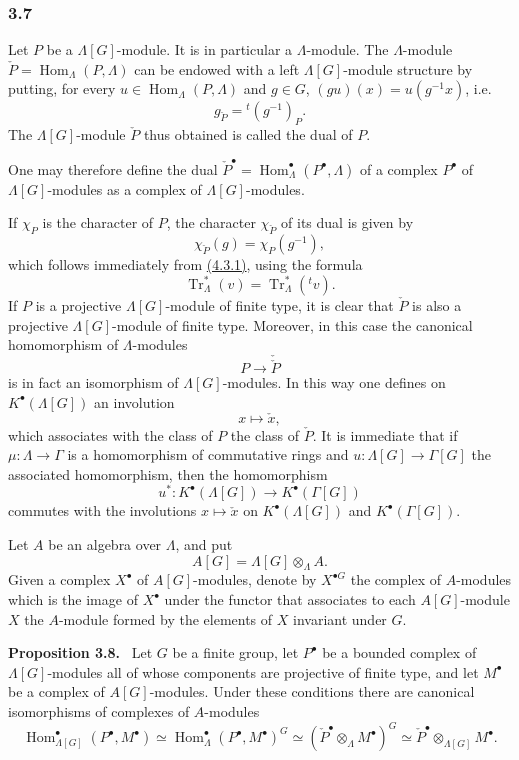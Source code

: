\documentclass[11pt]{article}
\newenvironment{statement}[1]{\par\medskip\noindent\textbf{#1.}\ }{\par\medskip}
\DeclareMathOperator{\Hom}{Hom}
\providecommand{\Tr}{\operatorname{Tr}}
\providecommand{\Tr}{\operatorname{Tr}}
\providecommand{\Tr}{\operatorname{Tr}}
\providecommand{\Hom}{\operatorname{Hom}}
\providecommand{\Tr}{\operatorname{Tr}}
\providecommand{\Hom}{\operatorname{Hom}}
\providecommand{\Tr}{\operatorname{Tr}}
\begin{document}
\subsubsection*{3.7}\label{sga5:X:subsubsection:3.7}

Let $P$ be a $\Lambda[G]$-module. It is in particular a $\Lambda$-module. The $\Lambda$-module $\check P=\Hom_\Lambda(P,\Lambda)$ can be endowed with a left $\Lambda[G]$-module structure by putting, for every $u\in\Hom_\Lambda(P,\Lambda)$ and $g\in G$, $(gu)(x)=u(g^{-1}x)$, i.e.
\[
g_{\check P}={}^{t}(g^{-1})_P.
\tag{3.7.1}\label{sga5:X:equation:3.7.1}
\]
The $\Lambda[G]$-module $\check P$ thus obtained is called the dual of $P$.

One may therefore define the dual $\check P^\bullet=\Hom_\Lambda^\bullet(P^\bullet,\Lambda)$ of a complex $P^\bullet$ of $\Lambda[G]$-modules as a complex of $\Lambda[G]$-modules.

If $\chi_P$ is the character of $P$, the character $\chi_{\check P}$ of its dual is given by
\[
\chi_{\check P}(g)=\chi_P(g^{-1}),
\tag{3.7.2}\label{sga5:X:equation:3.7.2}
\]
which follows immediately from \hyperref[sga5:X:equation:3.7.1]{(4.3.1)}, using the formula
\[
\Tr_\Lambda^*(v)=\Tr_\Lambda^*({}^{t}v).
\]
If $P$ is a projective $\Lambda[G]$-module of finite type, it is clear that $\check P$ is also a projective $\Lambda[G]$-module of finite type. Moreover, in this case the canonical homomorphism of $\Lambda$-modules
\[
P\longrightarrow\check{\check P}
\]
is in fact an isomorphism of $\Lambda[G]$-modules. In this way one defines on $K^{\bullet}(\Lambda[G])$ an involution
\[
x\longmapsto \check x,
\]
which associates with the class of $P$ the class of $\check P$. It is immediate that if $\mu:\Lambda\to\Gamma$ is a homomorphism of commutative rings and $u:\Lambda[G]\to\Gamma[G]$ the associated homomorphism, then the homomorphism
\[
u^*:K^{\bullet}(\Lambda[G])\longrightarrow K^{\bullet}(\Gamma[G])
\]
commutes with the involutions $x\longmapsto\check x$ on $K^{\bullet}(\Lambda[G])$ and $K^{\bullet}(\Gamma[G])$.

Let $A$ be an algebra over $\Lambda$, and put
\[
A[G]=\Lambda[G]\otimes_\Lambda A.
\]
Given a complex $X^\bullet$ of $A[G]$-modules, denote by $X^{\bullet G}$ the complex of $A$-modules which is the image of $X^\bullet$ under the functor that associates to each $A[G]$-module $X$ the $A$-module formed by the elements of $X$ invariant under $G$.

\label{sga5:X:proposition:3.8}\begin{statement}{Proposition 3.8}
Let $G$ be a finite group, let $P^\bullet$ be a bounded complex of $\Lambda[G]$-modules all of whose components are projective of finite type, and let $M^\bullet$ be a complex of $A[G]$-modules. Under these conditions there are canonical isomorphisms of complexes of $A$-modules
\[
\Hom_{\Lambda[G]}^\bullet(P^\bullet,M^\bullet)
\simeq \Hom_\Lambda^\bullet(P^\bullet,M^\bullet)^G
\simeq (\check P^\bullet\otimes_\Lambda M^\bullet)^G
\simeq \check P^\bullet\otimes_{\Lambda[G]}M^\bullet.
\tag{3.8.1}\label{sga5:X:equation:3.8.1}
\]
\end{statement}
\end{document}
